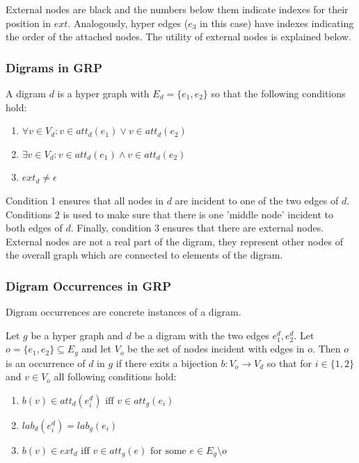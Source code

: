 External nodes are black and the numbers below them indicate indexes for their position in $ext$. Analogously,  hyper edges ($e_3$ in this case) have indexes indicating the order of the attached nodes. The utility of external nodes is explained below.~\cite{maneth}

\subsubsection{Digrams in GRP}

A digram $d$ is a hyper graph with $E_d=\{e_1,e_2\}$ so that the following conditions hold:

\begin{enumerate}
	\item $\forall v \in V_d : v\in att_d(e_1) \vee v \in att_d(e_2)$
	\item $\exists v\in V_d : v\in att_d(e_1) \wedge v\in att_d(e_2)$
	\item $ext_d \not= \epsilon$
\end{enumerate}

Condition 1 ensures that all nodes in $d$ are incident to one of the two edges of $d$. Conditions 2 is used to make sure that there is one 'middle node' incident to both edges of $d$. Finally, condition 3 ensures that there are external nodes. External nodes are not a real part of the digram, they represent other nodes of the overall graph which are connected to elements of the digram.~\cite{maneth}


\subsubsection{Digram Occurrences in GRP}

Digram occurrences are concrete instances of a digram.

Let $g$ be a hyper graph and $d$ be a digram with the two edges $e_1^d,e_2^d$. Let $o=\{e_1,e_2\} \subseteq E_g$ and let $V_o$ be the set of nodes incident with edges in $o$. Then $o$ is an occurrence of $d$ in $g$ if there exits a bijection $b:V_o \to V_d$ so that for $i\in \{1,2\} $ and $v\in V_o$ all following conditions hold:

\begin{enumerate}
	\item $b(v)\in att_d(e_i^d) \text{ iff } v\in att_g(e_i)$
	\item $lab_d(e_i^d)=lab_g(e_i)$
	\item $b(v)\in ext_d \text{ iff } v\in att_g(e) \text{ for some } e\in E_g \setminus o$
\end{enumerate}

